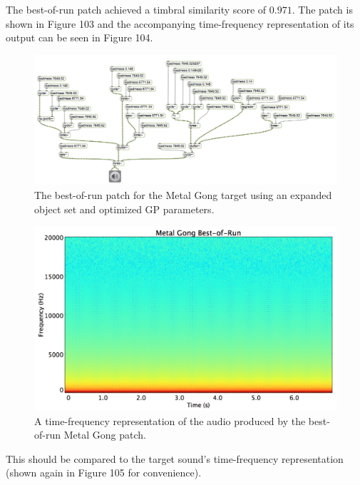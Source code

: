 \documentclass[12pt]{report} 	%
\numberwithin{figure}{chapter}
\numberwithin{table}{chapter}
\numberwithin{equation}{chapter}
\begin{document}
\begin{flushleft}
The best-of-run patch achieved a timbral similarity score of $0.971$. The patch is shown in Figure 103 and the accompanying time-frequency representation of its output can be seen in Figure 104.
\begin{figure}[h!]
\begin{center}
\includegraphics[angle=270, scale=0.49]{MetalGong_Best}
\caption[Metal gong best-of-run patch]{The best-of-run patch for the Metal Gong target using an expanded object set and optimized GP parameters.}
\end{center}
\end{figure}
\begin{figure}[h!]
\begin{center}
\includegraphics[scale=0.34]{MetalGongBestOfRunSTFT}
\caption[Best-of-run metal gong time-frequency representation]{A time-frequency representation of the audio produced by the best-of-run Metal Gong patch.}
\end{center}
\vspace{12pt}
\end{figure}
This should be compared to the target sound's time-frequency representation (shown again in Figure 105 for convenience).
\begin{figure}[h!]

\end{figure}
\end{flushleft}
\end{document}
